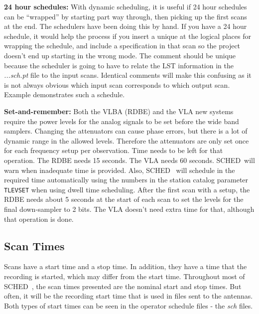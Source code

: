 \documentclass{report}
\newcommand{\schedb}{{\sc SCHED~}}
\begin{document}
\begin{list}{}{\parsep .5em  \itemsep .5em }
\item{\bf 24 hour schedules:} With dynamic scheduling, it is useful if
24 hour schedules can be ``wrapped'' by starting part way through,
then picking up the first scans at the end.  The schedulers have been
doing this by hand.  If you have a 24 hour schedule, it would help the
process if you insert a unique  at
the logical places for wrapping the schedule, and include a
 specification in that scan so the
project doesn't end up starting in the wrong mode.  The comment should
be unique because the scheduler is going to have to relate the LST
information in the {\sl ...sch.pt} file to the input scans.  Identical
comments will make this confusing as it is not always obvious which
input scan corresponds to which output scan.  Example 
demonstrates such a schedule.

\item{\bf Set-and-remember:}  Both the VLBA (RDBE) and the VLA new
systems require the power levels for the analog signals to be set
before the wide band samplers.  Changing the attenuators can cause
phase errors, but there is a lot of dynamic range in the allowed 
levels.  Therefore the attenuators are only set once for each 
frequency setup per observation.  Time needs to be left for that
operation.  The RDBE needs 15 seconds.  The VLA needs 60 seconds.
\schedb will warn when inadequate time is provided.  Also, \schedb
will schedule in the required time automatically using the numbers
in the station catalog parameter {\tt TLEVSET} when using dwell
time scheduling.  After the first scan with a setup, the RDBE needs
about 5 seconds at the start of each scan to set the levels for
the final down-sampler to 2 bits.  The VLA doesn't need extra time
for that, although that operation is done.


\end{list}



\subsection{\label{SSEC:SCANTIMES}Scan Times}

Scans have a start time and a stop time.  In addition, they have a
time that the recording is started, which may differ from the start
time.  Throughout most of \schedb, the scan times presented are the
nominal start and stop times.  But often, it will be the recording
start time that is used in files sent to the antennas.  Both types of
start times can be seen in the operator schedule files - the {\sl sch}
files.
\end{document}

